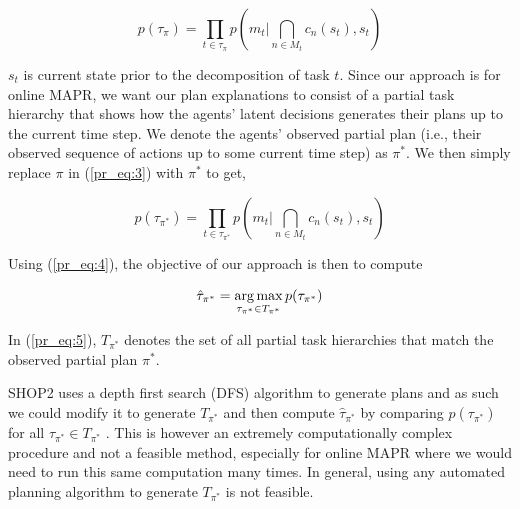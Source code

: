 \begin{equation} \label{pr_eq:3}
p(\tau_\pi) = \prod_{t \in \tau_\pi} p(m_t | \bigcap_{n \in M_t} c_n(s_t), s_t) 
\end{equation}

$s_t$ is current state prior to the decomposition of task $t$. Since our approach is for online MAPR, we want our plan explanations to consist of a partial task hierarchy that shows how the agents' latent decisions generates their plans up to the current time step. We denote the agents' observed partial plan (i.e., their observed sequence of actions up to some current time step) as $\pi^*$. We then simply replace $\pi$ in (\ref{pr_eq:3}) with $\pi^*$ to get,

\begin{equation} \label{pr_eq:4}
p(\tau_{\pi^*}) = \prod_{t \in \tau_{\pi^*}} p(m_t | \bigcap_{n \in M_t} c_n(s_t), s_t) 
\end{equation}

Using (\ref{pr_eq:4}), the objective of our approach is then to compute 

\begin{equation} \label{pr_eq:5}
\hat{\tau}_{\pi^*} = \operatorname*{arg\,max}_{\tau_{\pi^*} \in T_{\pi^*}} p(\tau_{\pi^*})
\end{equation}

In (\ref{pr_eq:5}), $T_{\pi^*}$ denotes the set of all partial task hierarchies that match the observed partial plan $\pi^*$.

SHOP2 uses a depth first search (DFS) algorithm to generate plans and as such we could modify it to generate $T_{\pi^*}$ and then compute $\hat{\tau}_{\pi^*}$ by comparing $p(\tau_{\pi^*})$ for all $\tau_{\pi^*} \in T_{\pi^*}$ \citep{Nau_2003}. This is however an extremely computationally complex procedure and not a feasible method, especially for online MAPR where we would need to run this same computation many times. In general, using any automated planning algorithm to generate $T_{\pi^*}$ is not feasible. 

